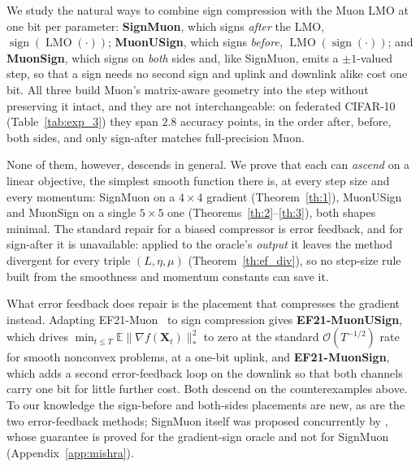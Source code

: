 We study the natural ways to combine sign compression with the Muon LMO at one bit per parameter: \textbf{SignMuon}, which signs \emph{after} the LMO, $\operatorname{sign}(\operatorname{LMO}(\cdot))$; \textbf{MuonUSign}, which signs \emph{before}, $\operatorname{LMO}(\operatorname{sign}(\cdot))$; and \textbf{MuonSign}, which signs on \emph{both} sides and, like SignMuon, emits a $\pm1$-valued step, so that a sign needs no second sign and uplink and downlink alike cost one bit. All three build Muon's matrix-aware geometry into the step without preserving it intact, and they are not interchangeable: on federated CIFAR-10 (Table~\ref{tab:exp_3}) they span $2.8$ accuracy points, in the order after, before, both sides, and only sign-after matches full-precision Muon.

None of them, however, descends in general. We prove that each can \emph{ascend} on a linear objective, the simplest smooth function there is, at every step size and every momentum: SignMuon on a $4\times4$ gradient (Theorem~\ref{th:1}), MuonUSign and MuonSign on a single $5\times5$ one (Theorems~\ref{th:2}--\ref{th:3}), both shapes minimal. The standard repair for a biased compressor is error feedback, and for sign-after it is unavailable: applied to the oracle's \emph{output} it leaves the method divergent for every triple $(L,\eta,\mu)$ (Theorem~\ref{th:ef_div}), so no step-size rule built from the smoothness and momentum constants can save it.

What error feedback does repair is the placement that compresses the gradient instead. Adapting EF21-Muon~\citep{gruntkowska2025error} to sign compression gives \textbf{EF21-MuonUSign}, which drives $\min_{t\le T}\mathbb{E}\|\nabla f(\mathbf{X}_t)\|_*^2$ to zero at the standard $\mathcal{O}(T^{-1/2})$ rate for smooth nonconvex problems, at a one-bit uplink, and \textbf{EF21-MuonSign}, which adds a second error-feedback loop on the downlink so that both channels carry one bit for little further cost. Both descend on the counterexamples above. To our knowledge the sign-before and both-sides placements are new, as are the two error-feedback methods; SignMuon itself was proposed concurrently by \citet{mishra2026signmuon}, whose guarantee is proved for the gradient-sign oracle and not for SignMuon (Appendix~\ref{app:mishra}).

